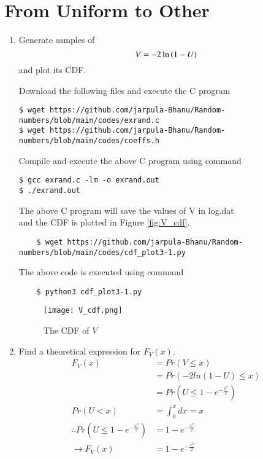 \documentclass[journal,12pt,twocolumn]{IEEEtran}
\renewcommand\thesection{\arabic{section}}
\begin{document}
\section{From Uniform to Other}
\begin{enumerate}[label=\thesection.\arabic*
,ref=\thesection.\theenumi]
\item
Generate samples of 
\begin{equation}
V = -2\ln\left(1-U\right)
\end{equation}
and plot its CDF. 

\solution
Download the following files and execute the C program
\begin{lstlisting}
$ wget https://github.com/jarpula-Bhanu/Random-numbers/blob/main/codes/exrand.c
$ wget https://github.com/jarpula-Bhanu/Random-numbers/blob/main/codes/coeffs.h
\end{lstlisting}
Compile and execute the above C program using command
\begin{lstlisting}
$ gcc exrand.c -lm -o exrand.out
$ ./exrand.out
\end{lstlisting}
The above C program will save the values of V in log.dat\\

and the CDF is plotted in Figure \eqref{fig:V_cdf}.

\begin{lstlisting}
    $ wget https://github.com/jarpula-Bhanu/Random-numbers/blob/main/codes/cdf_plot3-1.py
\end{lstlisting}
The above code is executed using command
\begin{lstlisting}
    $ python3 cdf_plot3-1.py
\end{lstlisting}


\begin{figure}[h]
    \centering
    \texttt{[image: V\_cdf.png]}
    \caption{The CDF of $V$}
    \label{fig:V_cdf}
\end{figure}

\item Find a theoretical expression for $F_V(x)$.\\
\solution
\begin{align}
    F_V(x) &= Pr(V \le x)\\
    &= Pr(-2 ln(1-U) \le x) \\
    &= Pr(U \le 1-e^{-\frac{x^2}{2}}) \\
    Pr(U<x) &= \int_0^x dx = x \\
    \therefore Pr(U \le 1-e^{-\frac{x^2}{2}}) &= 1-e^{-\frac{x^2}{2}} \\
    \rightarrow F_V(x) &=1-e^{-\frac{x^2}{2}}
\end{align}
%
\end{enumerate}
\end{document}
